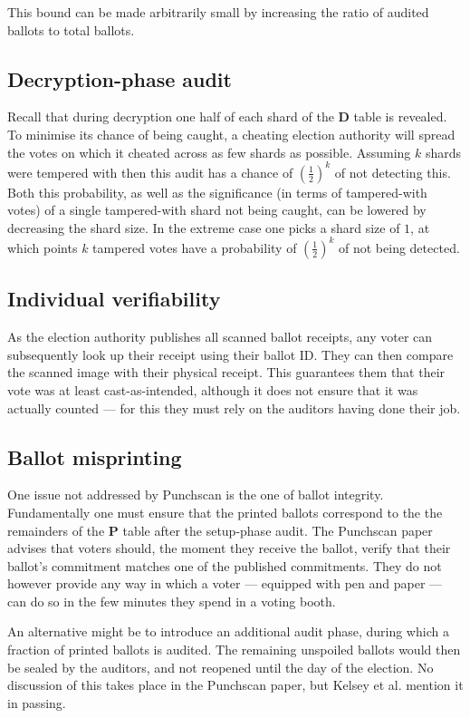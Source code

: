 This bound can be made arbitrarily small by increasing the ratio of audited
ballots to total ballots.

\subsection{Decryption-phase audit}

Recall that during decryption one half of each shard of the \textbf{D} table is
revealed. To minimise its chance of being caught, a cheating election authority
will spread the votes on which it cheated across as few shards as possible.
Assuming $k$ shards were tempered with then this audit has a chance of
$(\frac{1}{2})^k$ of not detecting this. Both this probability, as well as the
significance (in terms of tampered-with votes) of a single tampered-with shard
not being caught, can be lowered by decreasing the shard size. In the extreme
case one picks a shard size of $1$, at which points $k$ tampered votes have a
probability of $(\frac{1}{2})^k$ of not being detected.

\subsection{Individual verifiability}

As the election authority publishes all scanned ballot receipts, any voter can
subsequently look up their receipt using their ballot ID. They can then compare
the scanned image with their physical receipt. This guarantees them that their
vote was at least cast-as-intended, although it does not ensure that it was
actually counted --- for this they must rely on the auditors having done their
job.

\subsection{Ballot misprinting}

One issue not addressed by Punchscan is the one of ballot integrity.
Fundamentally one must ensure that the printed ballots correspond to the the
remainders of the \textbf{P} table after the setup-phase audit. The Punchscan
paper advises that voters should, the moment they receive the ballot, verify
that their ballot's commitment matches one of the published commitments. They
do not however provide any way in which a voter --- equipped with pen and paper
--- can do so in the few minutes they spend in a voting booth.

An alternative might be to introduce an additional audit phase, during which a
fraction of printed ballots is audited. The remaining unspoiled ballots would
then be sealed by the auditors, and not reopened until the day of the election.
No discussion of this takes place in the Punchscan paper, but Kelsey et
al.\autocite{kelseyAttackingPaperBasedE2E2010} mention it in passing.

